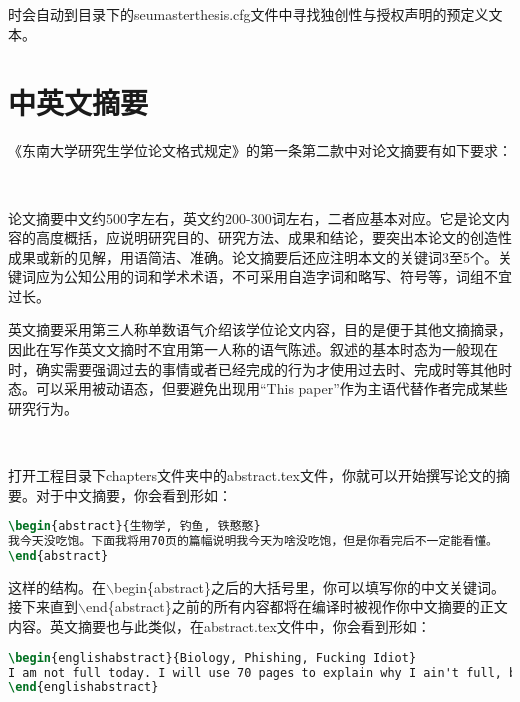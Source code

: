 \noindent 时会自动到目录下的seumasterthesis.cfg文件中寻找独创性与授权声明的预定义文本。

\section{中英文摘要}

《东南大学研究生学位论文格式规定》\cite{seugs2023rule}的第一条第二款中对论文摘要有如下要求：

~

{\color{black!45}
\noindent 论文摘要中文约500字左右，英文约200-300词左右，二者应基本对应。它是论文内容的高度概括，应说明研究目的、研究方法、成果和结论，要突出本论文的创造性成果或新的见解，用语简洁、准确。论文摘要后还应注明本文的关键词3至5个。关键词应为公知公用的词和学术术语，不可采用自造字词和略写、符号等，词组不宜过长。

\noindent 英文摘要采用第三人称单数语气介绍该学位论文内容，目的是便于其他文摘摘录，因此在写作英文文摘时不宜用第一人称的语气陈述。叙述的基本时态为一般现在时，确实需要强调过去的事情或者已经完成的行为才使用过去时、完成时等其他时态。可以采用被动语态，但要避免出现用“This paper”作为主语代替作者完成某些研究行为。}

~

打开工程目录下chapters文件夹中的abstract.tex文件，你就可以开始撰写论文的摘要。对于中文摘要，你会看到形如：

\begin{tcolorbox}
\begin{lstlisting}[language=TeX]
\begin{abstract}{生物学, 钓鱼, 铁憨憨}
我今天没吃饱。下面我将用70页的篇幅说明我今天为啥没吃饱，但是你看完后不一定能看懂。
\end{abstract}
\end{lstlisting}
\end{tcolorbox}

\noindent 这样的结构。在{\codefont $\backslash$begin\{abstract\}}之后的大括号里，你可以填写你的中文关键词。接下来直到{\codefont $\backslash$end\{abstract\}}之前的所有内容都将在编译时被视作你中文摘要的正文内容。英文摘要也与此类似，在abstract.tex文件中，你会看到形如：

\begin{tcolorbox}
\begin{lstlisting}[language=TeX]
\begin{englishabstract}{Biology, Phishing, Fucking Idiot}
I am not full today. I will use 70 pages to explain why I ain't full, but you may not understand after reading this piece of shit.
\end{englishabstract}
\end{lstlisting}
\end{tcolorbox}

